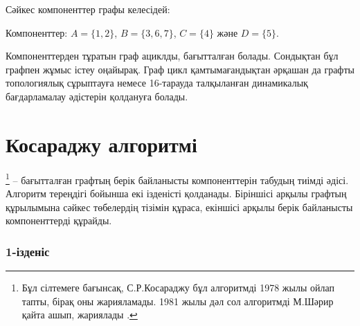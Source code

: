 Сәйкес компоненттер графы келесідей:
\begin{center}
\end{center}
Компоненттер: $A=\{1,2\}$,
$B=\{3,6,7\}$, $C=\{4\}$ және $D=\{5\}$.

Компоненттерден тұратын граф ациклды, бағытталған болады.
Сондықтан бұл графпен жұмыс істеу оңайырақ. Граф цикл қамтымағандықтан
әрқашан да графты топологиялық сұрыптауға немесе 16-тарауда
талқыланған динамикалық бағдарламалау әдістерін қолдануға болады.

\section{Косараджу алгоритмі}


\footnote{Бұл сілтемеге \cite{aho83} бағынсақ,
С.Р.Косараджу бұл алгоритмді 1978 жылы ойлап тапты, бірақ оны жарияламады. 1981 жылы дәл сол алгоритмді М.Шәрир қайта ашып, жариялады \cite{sha81}.} -- бағытталған графтың берік байланысты компоненттерін 
табудың тиімді әдісі. Алгоритм  тереңдігі бойынша екі
ізденісті қолданады. Біріншісі арқылы графтың құрылымына сәйкес төбелердің
тізімін  құраса, екіншісі арқылы берік байланысты компоненттерді құрайды.

\subsubsection{1-ізденіс}

